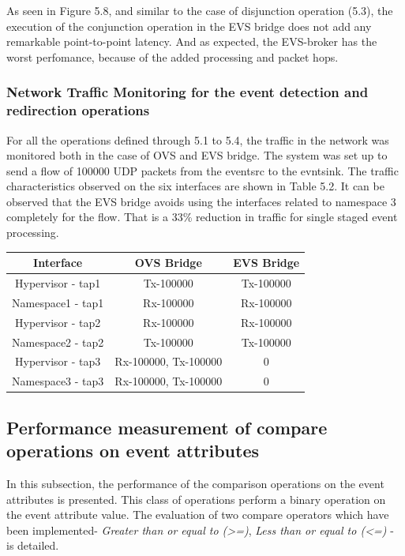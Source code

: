 As seen in Figure 5.8, and similar to the case of disjunction operation (5.3), the execution of the conjunction operation in the EVS bridge does not add any remarkable point-to-point latency. And as expected, the EVS-broker has the worst perfomance, because of the added processing and packet hops.

\subsubsection{Network Traffic Monitoring for the event detection and redirection operations}
For all the operations defined through 5.1 to 5.4, the traffic in the network was monitored both in the case of OVS and EVS bridge. The system was set up to send a flow of 100000 UDP packets from the eventsrc to the evntsink. The traffic characteristics observed on the six interfaces are shown in Table 5.2. It can be observed that the EVS bridge avoids using the interfaces related to namespace 3 completely for the flow. That is a 33\% reduction in traffic for single staged event processing.

\begin{center}
	 \label{tab:title} 
	\begin{tabular}{ |c|c|c| }
		\hline
		 \textbf{Interface} &  \textbf{OVS Bridg}e &  \textbf{EVS Bridge} \\\toprule
		\hline
		Hypervisor - tap1 & Tx-100000 & Tx-100000  \\
		\hline 
		Namespace1 - tap1 & Rx-100000 & Rx-100000 \\
		\hline		
		Hypervisor - tap2 &  Rx-100000 & Rx-100000  \\ 
		\hline
		Namespace2 - tap2 & Tx-100000 & Tx-100000 \\
		\hline		
		Hypervisor - tap3 & Rx-100000, Tx-100000 & 0  \\ 
		\hline
		Namespace3 - tap3 & Rx-100000, Tx-100000 & 0 \\
		\hline
	\end{tabular}
\end{center}


\subsection{Performance measurement of compare operations on event attributes}
In this subsection, the performance of the comparison operations on the event attributes is presented. This class of operations perform a binary operation on the event attribute value. The evaluation of two compare operators which have been implemented- \textit{Greater than or equal to (>=)}, \textit{Less than or equal to (<=)} - is detailed. 

